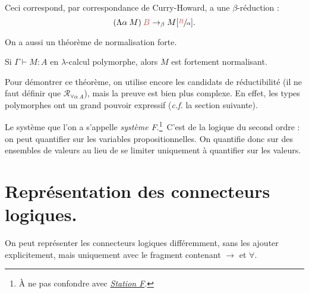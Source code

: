 \documentclass[./main]{subfiles}
\begin{document}
  Ceci correspond, par correspondance de Curry-Howard, a une $\beta$-réduction :
  \[
    (\Lambda \alpha \: M) \: {\color{nicered} B} \to_\beta M[\sfrac{{\color{nicered} B}}{\alpha}]
  .\]

  On a aussi un théorème de normalisation forte.
  \begin{thm}
    Si $\Gamma \vdash M : A$ en $\lambda$-calcul polymorphe, alors $M$ est fortement normalisant.
  \end{thm}

  Pour démontrer ce théorème, on utilise encore les candidats de réductibilité (il ne faut définir que $\mathcal{R}_{\forall \alpha \: A}$), mais la preuve est bien plus complexe. En effet, les types polymorphes ont un grand pouvoir expressif (\textit{c.f.} la section suivante).

  Le système que l'on a s'appelle \textit{système F}.\footnote{À ne pas confondre avec \href{https://fr.wikipedia.org/wiki/Station_F}{\textit{Station F}}.}\showfootnote\ C'est de la logique du second ordre : on peut quantifier sur les variables propositionnelles.
  On quantifie donc sur des ensembles de valeurs au lieu de se limiter uniquement à quantifier sur les valeurs.

  \section{Représentation des connecteurs logiques.}

  On peut représenter les connecteurs logiques différemment, sans les ajouter explicitement, mais uniquement avec le fragment contenant $\to$ et $\forall$.
\end{document}
